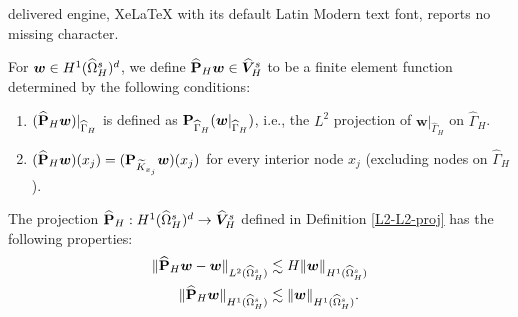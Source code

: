 \documentclass[10pt,a4paper]{amsart}
\newcommand{\bs}[1]{\boldsymbol{#1}}
\begin{document}
delivered engine, XeLaTeX with its default Latin Modern text font, reports no missing character.
\begin{definition}\label{L2-L2-proj}
For ${\bs w}\in H^1(\widehat\Omega^{\rm s}_H)^d$, we define $\widehat{\bf P}_H{\bs w}\in \widehat{\bs V}^{\rm s}_H$ to be a finite element function determined by the following conditions: 
\begin{enumerate}
\item 
$(\widehat{\bf P}_H{\bs w})|_{\widehat\Gamma_H}$ is defined as ${\bf P}_{\widehat\Gamma_H}({\bs w}|_{\widehat\Gamma_H})$, i.e., the $L^2$ projection of ${\bs w}|_{\widehat\Gamma_H}$ on $\widehat\Gamma_H$. 

\item 
$(\widehat{\bf P}_H{\bs w})(x_j)=({\bf P}_{\widetilde K_{x_j}}{\bs w})(x_j)$ for every interior node $x_j$ {\rm(}excluding nodes on $\widehat\Gamma_H${\rm)}.
\end{enumerate}
\end{definition}

\begin{lemma}\label{Lemma:PH}
The projection $\widehat{\bf P}_H:H^1(\widehat\Omega^{\rm s}_H)^d\rightarrow \widehat{\bs V}^{\rm s}_H$ defined in Definition \ref{L2-L2-proj} has the following properties: 
\begin{align*}
\|\widehat{\bf P}_H{\bs w} - {\bs w}\|_{L^2(\widehat\Omega^{\rm s}_H)}
&\lesssim H\|{\bs w}\|_{H^1(\widehat\Omega^{\rm s}_H)} \\
\|\widehat{\bf P}_H{\bs w}\|_{H^1(\widehat\Omega^{\rm s}_H)}
&\lesssim \|{\bs w}\|_{H^1(\widehat\Omega^{\rm s}_H)} .
\end{align*}
\end{lemma}
\end{document}
